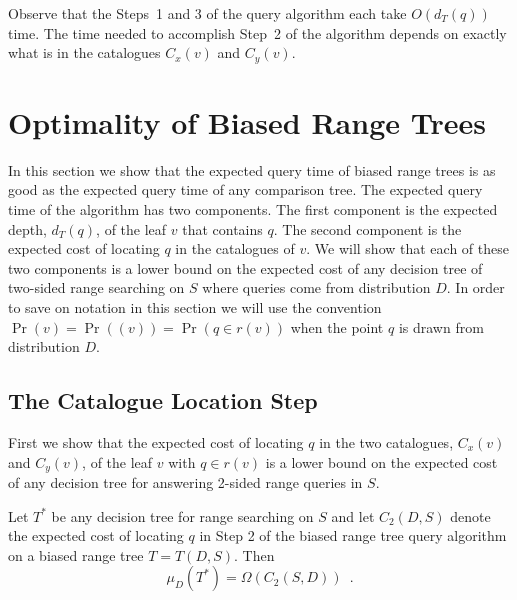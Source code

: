 \documentclass[lotsofwhite,charterfonts]{patmorin}
\begin{document}
Observe that the Steps~1 and 3 of the query algorithm each take
$O(d_T(q))$ time.  The time needed to accomplish Step~2 of the
algorithm depends on exactly what is in the catalogues $C_x(v)$ and
$C_y(v)$.

\section{Optimality of Biased Range Trees}

In this section we show that the expected query time of biased range
trees is as good as the expected query time of any comparison tree.
The expected query time of the algorithm has two components.  The
first component is the expected depth, $d_T(q)$,  of the leaf $v$ that
contains $q$.  The second component is the expected cost of locating
$q$ in the catalogues of $v$.  We will show that each of these two
components is a lower bound on the expected cost of any decision tree
of two-sided range searching on $S$ where queries come from
distribution $D$.  In order to save on notation in this section we
will use the convention $\Pr(v)=\Pr((v)) = \Pr(q\in r(v))$ when the
point $q$ is drawn from distribution $D$.

\subsection{The Catalogue Location Step}

First we show that the expected cost of locating $q$ in the two
catalogues, $C_x(v)$ and $C_y(v)$, of the leaf $v$ with $q\in r(v)$ is
a lower bound on the expected cost of any decision tree for answering
2-sided range queries in $S$. 

\begin{lem}
Let $T^*$ be any decision tree for range searching on $S$ and let
$C_2(D,S)$ denote the expected cost of locating $q$ in Step 2 of the
biased range tree query algorithm on a biased range tree $T=T(D,S)$. 
Then
\[
  \mu_D(T^*) = \Omega(C_2(S,D)) \enspace .
\] 
\end{lem}
\end{document}
